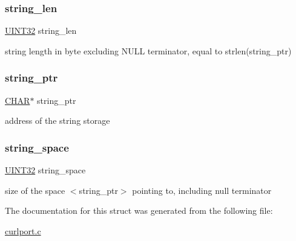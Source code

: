 \subsubsection{\texorpdfstring{string\+\_\+len}{string\_len}}
{\footnotesize\ttfamily \mbox{\hyperlink{boattypes_8h_ae1e6edbbc26d6fbc71a90190d0266018}{U\+I\+N\+T32}} string\+\_\+len}



string length in byte excluding N\+U\+LL terminator, equal to strlen(string\+\_\+ptr) 

\mbox{\label{struct_t_curl_port_string_with_len_ac2b26a2487af8ce48217b0b1f3890710}} 
\subsubsection{\texorpdfstring{string\+\_\+ptr}{string\_ptr}}
{\footnotesize\ttfamily \mbox{\hyperlink{boattypes_8h_aebb9e13210d88d43e32e735ada43a425}{C\+H\+AR}}$\ast$ string\+\_\+ptr}



address of the string storage 

\mbox{\label{struct_t_curl_port_string_with_len_ad0ed73766a322bfb92ce6f8cedc29bf8}} 
\subsubsection{\texorpdfstring{string\+\_\+space}{string\_space}}
{\footnotesize\ttfamily \mbox{\hyperlink{boattypes_8h_ae1e6edbbc26d6fbc71a90190d0266018}{U\+I\+N\+T32}} string\+\_\+space}



size of the space $<$string\+\_\+ptr$>$ pointing to, including null terminator 



The documentation for this struct was generated from the following file\+:\begin{DoxyCompactItemize}
\item 
\mbox{\hyperlink{curlport_8c}{curlport.\+c}}\end{DoxyCompactItemize}
